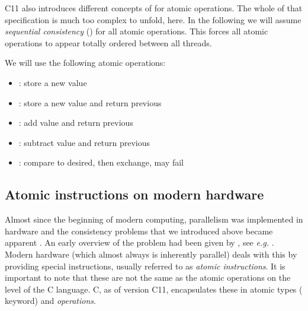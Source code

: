 C11 also introduces different concepts of  for atomic
operations. The whole of that specification is much too complex to
unfold, here. In the following we will assume \emph{sequential
consistency} () for all atomic
operations. This forces all atomic operations to appear totally
ordered between all threads.

We will use the following atomic operations:
\itemadjust
\begin{itemize}
\item[] \hspace*{-3ex}: store a new value
\itemadjust
\item[] \hspace*{-3ex}: store a new value and
 return previous
\itemadjust
\item[] \hspace*{-3ex}: add value and
 return previous
\itemadjust
\item[] \hspace*{-3ex}: subtract value and
 return previous
\itemadjust
\item[] \hspace*{-3ex}: compare to desired, then
  exchange, may fail
\end{itemize}
\fi

\subsection{Atomic instructions on modern hardware}
\label{sec-2-2}
Almost since the beginning of modern computing, parallelism was
implemented in hardware and the consistency problems that we
introduced above became apparent
\iflong
.
An early overview of the problem had been given by
\else
,
see \textsl{e.g.}
\fi
\cite{Netzer1992}.
Modern hardware
\iflong%
(which almost always is inherently parallel)
\fi%
deals with this by providing special
instructions, usually referred to as \emph{atomic instructions}.
\iflong%
It is important to note that these are not the same as the atomic
operations on the level of the C language.
\else
C, as of version C11, encapsulates these in atomic types (
keyword) and \emph{operations}.
\fi

